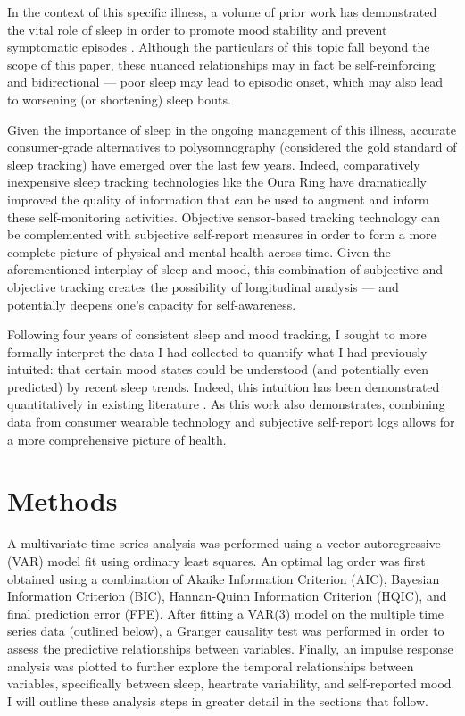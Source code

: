 \documentclass{article}
\begin{document}
In the context of this specific illness, a volume of prior work has demonstrated
the vital role of sleep in order to promote mood stability and prevent
symptomatic episodes
\citep{harveySleep2009,murrayCircadian2010,gruberSleep2011}. Although the
particulars of this topic fall beyond the scope of this paper, these nuanced
relationships may in fact be self-reinforcing and bidirectional --- poor sleep
may lead to episodic onset, which may also lead to worsening (or shortening)
sleep bouts.

Given the importance of sleep in the ongoing management of this illness,
accurate consumer-grade alternatives to polysomnography (considered the gold
standard of sleep tracking) have emerged over the last few years. Indeed,
comparatively inexpensive sleep tracking technologies like the Oura Ring have
dramatically improved the quality of information that can be used to augment and
inform these self-monitoring activities. Objective sensor-based tracking
technology can be complemented with subjective self-report measures in order to
form a more complete picture of physical and mental health across time. Given
the aforementioned interplay of sleep and mood, this combination of subjective
and objective tracking creates the possibility of longitudinal analysis --- and
potentially deepens one's capacity for self-awareness.

Following four years of consistent sleep and mood tracking, I sought to more
formally interpret the data I had collected to quantify what I had previously
intuited: that certain mood states could be understood (and potentially even
predicted) by recent sleep trends. Indeed, this intuition has been demonstrated
quantitatively in existing literature \citep{boseVector2017,
moshePredicting2021, jafarlouObjective2023}. As this work also demonstrates,
combining data from consumer wearable technology and subjective self-report logs
allows for a more comprehensive picture of health.

\hypertarget{methods}{%
\section{Methods}\label{methods}}

A multivariate time series analysis was performed using a vector autoregressive
(VAR) model fit using ordinary least squares. An optimal lag order was first
obtained using a combination of Akaike Information Criterion (AIC), Bayesian
Information Criterion (BIC), Hannan-Quinn Information Criterion (HQIC), and
final prediction error (FPE). After fitting a VAR(3) model on the multiple time
series data (outlined below), a Granger causality test was performed in order to
assess the predictive relationships between variables. Finally, an impulse
response analysis was plotted to further explore the temporal relationships
between variables, specifically between sleep, heartrate variability, and
self-reported mood. I will outline these analysis steps in greater detail in the
sections that follow.
\end{document}
